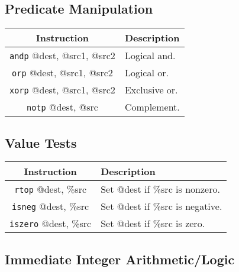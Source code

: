 \documentclass[10pt,letterpaper]{article}
\begin{document}
\subsection{Predicate Manipulation}

\begin{center}
\begin{tabular}{cl}
\textbf{Instruction}&\textbf{Description}\\
\hline
\texttt{andp} @dest, @src1, @src2&Logical and.\\
\texttt{orp} @dest, @src1, @src2&Logical or.\\
\texttt{xorp} @dest, @src1, @src2&Exclusive or.\\
\texttt{notp} @dest, @src&Complement.\\
\end{tabular}
\end{center}

\subsection{Value Tests}

\begin{center}
\begin{tabular}{cl}
\textbf{Instruction}&\textbf{Description}\\
\hline
\texttt{rtop} @dest, \%src&Set @dest if \%src is nonzero.\\
\texttt{isneg} @dest, \%src&Set @dest if \%src is negative.\\
\texttt{iszero} @dest, \%src&Set @dest if \%src is zero.\\
\end{tabular}
\end{center}

\subsection{Immediate Integer Arithmetic/Logic}
\end{document}
